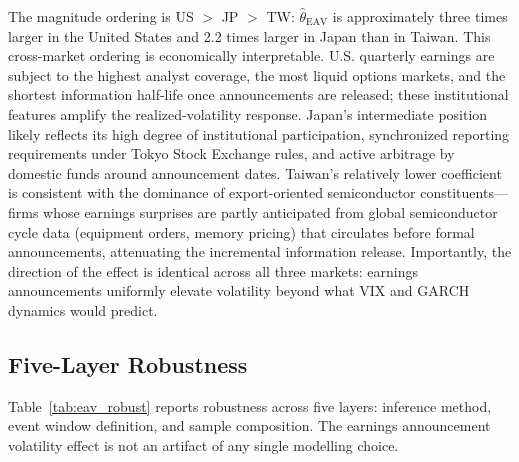 The magnitude ordering is US $>$ JP $>$ TW: $\hat{\theta}_{\text{EAV}}$ is approximately three times larger in the United States and 2.2 times larger in Japan than in Taiwan. This cross-market ordering is economically interpretable. U.S. quarterly earnings are subject to the highest analyst coverage, the most liquid options markets, and the shortest information half-life once announcements are released; these institutional features amplify the realized-volatility response. Japan's intermediate position likely reflects its high degree of institutional participation, synchronized reporting requirements under Tokyo Stock Exchange rules, and active arbitrage by domestic funds around announcement dates. Taiwan's relatively lower coefficient is consistent with the dominance of export-oriented semiconductor constituents---firms whose earnings surprises are partly anticipated from global semiconductor cycle data (equipment orders, memory pricing) that circulates before formal announcements, attenuating the incremental information release. Importantly, the direction of the effect is identical across all three markets: earnings announcements uniformly elevate volatility beyond what VIX and GARCH dynamics would predict.

\subsection{Five-Layer Robustness}
\label{sec:eav_robustness}

Table~\ref{tab:eav_robust} reports robustness across five layers: inference method, event window definition, and sample composition. The earnings announcement volatility effect is not an artifact of any single modelling choice.

